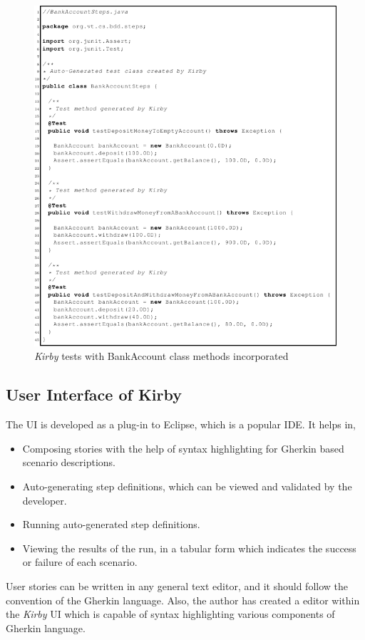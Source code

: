 \documentclass[conference, onecolumn, a4, 12pt]{IEEEtran}
\begin{document}
\begin{figure}
	\centering
	\includegraphics[width=0.7\linewidth]{Implemented_kirby_generated_test_class}
	\caption{\textit{Kirby} tests with BankAccount class methods incorporated}
	\label{fig:implementedkirbygeneratedtestclass}
\end{figure}

\subsection{User Interface of Kirby}
The UI is developed as a plug-in to Eclipse, which is a popular IDE. It helps in,
\begin{itemize}
	\item  Composing stories with the help of syntax highlighting for Gherkin based scenario descriptions.
	\item Auto-generating step definitions, which can be viewed and validated by the developer.
	\item Running auto-generated step definitions.
	\item  Viewing the results of the run, in a tabular form which indicates the success or failure of each scenario.
\end{itemize}

User stories can be written in any general text editor, and it should follow the convention of the Gherkin language. Also, the author has created a editor within the \textit{Kirby} UI which is capable of syntax highlighting various components of Gherkin language.
\end{document}
